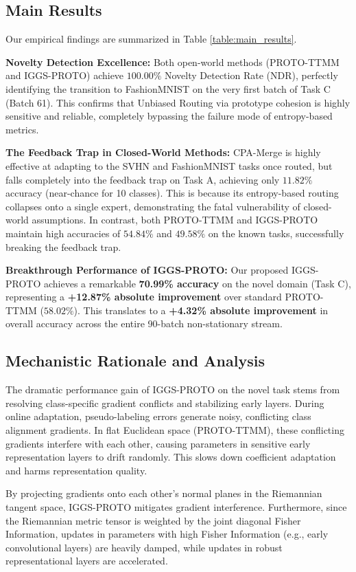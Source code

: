 \documentclass{article}
\theoremstyle{plain}
\theoremstyle{definition}
\theoremstyle{remark}
\begin{document}
\subsection{Main Results}
Our empirical findings are summarized in Table \ref{table:main_results}.

\textbf{Novelty Detection Excellence:} Both open-world methods (PROTO-TTMM and IGGS-PROTO) achieve $100.00\%$ Novelty Detection Rate (NDR), perfectly identifying the transition to FashionMNIST on the very first batch of Task C (Batch 61). This confirms that Unbiased Routing via prototype cohesion is highly sensitive and reliable, completely bypassing the failure mode of entropy-based metrics.

\textbf{The Feedback Trap in Closed-World Methods:} CPA-Merge is highly effective at adapting to the SVHN and FashionMNIST tasks once routed, but falls completely into the feedback trap on Task A, achieving only $11.82\%$ accuracy (near-chance for 10 classes). This is because its entropy-based routing collapses onto a single expert, demonstrating the fatal vulnerability of closed-world assumptions. In contrast, both PROTO-TTMM and IGGS-PROTO maintain high accuracies of $54.84\%$ and $49.58\%$ on the known tasks, successfully breaking the feedback trap.

\textbf{Breakthrough Performance of IGGS-PROTO:} Our proposed IGGS-PROTO achieves a remarkable \textbf{70.99\% accuracy} on the novel domain (Task C), representing a \textbf{+12.87\% absolute improvement} over standard PROTO-TTMM ($58.02\%$). This translates to a \textbf{+4.32\% absolute improvement} in overall accuracy across the entire 90-batch non-stationary stream.

\subsection{Mechanistic Rationale and Analysis}
The dramatic performance gain of IGGS-PROTO on the novel task stems from resolving class-specific gradient conflicts and stabilizing early layers. During online adaptation, pseudo-labeling errors generate noisy, conflicting class alignment gradients. In flat Euclidean space (PROTO-TTMM), these conflicting gradients interfere with each other, causing parameters in sensitive early representation layers to drift randomly. This slows down coefficient adaptation and harms representation quality.

By projecting gradients onto each other's normal planes in the Riemannian tangent space, IGGS-PROTO mitigates gradient interference. Furthermore, since the Riemannian metric tensor is weighted by the joint diagonal Fisher Information, updates in parameters with high Fisher Information (e.g., early convolutional layers) are heavily damped, while updates in robust representational layers are accelerated. 
\end{document}
